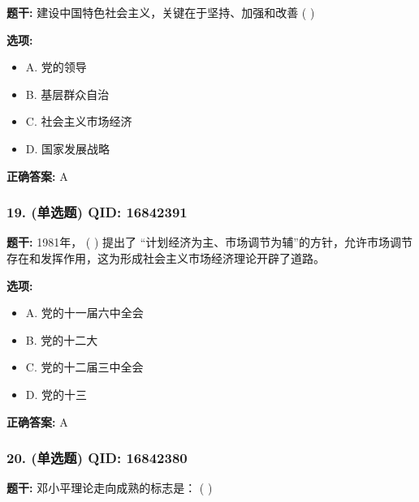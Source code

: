 \documentclass[12pt,UTF8]{ctexart}
\begin{document}
\textbf{题干:}
建设中国特色社会主义，关键在于坚持、加强和改善 ( )

\textbf{选项:}
\begin{itemize}[leftmargin=*]

  \item A. 党的领导

  \item B. 基层群众自治

  \item C. 社会主义市场经济

  \item D. 国家发展战略

\end{itemize}

\textbf{正确答案:}
A

\vspace{0.3em}\hrulefill\vspace{0.7em}

\subsubsection*{19. (单选题) \small QID: 16842391}

\textbf{题干:}
1981年， ( ) 提出了 “计划经济为主、市场调节为辅”的方针，允许市场调节存在和发挥作用，这为形成社会主义市场经济理论开辟了道路。

\textbf{选项:}
\begin{itemize}[leftmargin=*]

  \item A. 党的十一届六中全会

  \item B. 党的十二大

  \item C. 党的十二届三中全会

  \item D. 党的十三

\end{itemize}

\textbf{正确答案:}
A

\vspace{0.3em}\hrulefill\vspace{0.7em}

\subsubsection*{20. (单选题) \small QID: 16842380}

\textbf{题干:}
邓小平理论走向成熟的标志是： ( )
\end{document}
